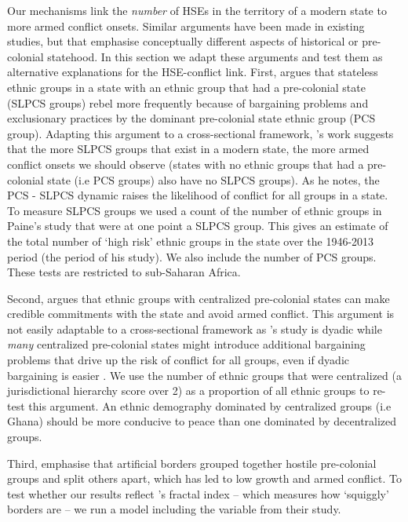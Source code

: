 Our mechanisms link the \emph{number} of HSEs in the territory of a modern state
to more armed conflict onsets. Similar arguments have been made in existing
studies, but that emphasise conceptually different aspects of historical or
pre-colonial statehood. In this section we adapt these arguments and test them
as alternative explanations for the HSE-conflict link. First, \citet{Paine2019}
argues that stateless ethnic groups in a state with an ethnic group that had a
pre-colonial state (SLPCS groups) rebel more frequently because of bargaining
problems and exclusionary practices by the dominant pre-colonial state ethnic
group (PCS group). Adapting this argument to a cross-sectional framework,
\citet{Paine2019}'s work suggests that the more SLPCS groups that exist in a
modern state, the more armed conflict onsets we should observe (states with no
ethnic groups that had a pre-colonial state (i.e PCS groups) also have no SLPCS
groups). As he notes, the PCS - SLPCS dynamic raises the likelihood of conflict
for all groups in a state. To measure SLPCS groups we used a count of the number
of ethnic groups in Paine's study that were at one point a SLPCS group. This
gives an estimate of the total number of `high risk' ethnic groups in the state
over the 1946-2013 period (the period of his study). We also include the number
of PCS groups. These tests are restricted to sub-Saharan Africa. 

Second, \citet{Wig2016} argues that ethnic groups with centralized pre-colonial
states can make credible commitments with the state and avoid armed conflict.
This argument is not easily adaptable to a cross-sectional framework as
\citet{Wig2016}'s study is dyadic while \textit{many} centralized pre-colonial
states might introduce additional bargaining problems that drive up the risk of
conflict for all groups, even if dyadic bargaining is easier
\citep{Cunningham2006, Walter2009}. We use the number of ethnic groups that
were centralized (a jurisdictional hierarchy score over 2) as a proportion of
all ethnic groups to re-test this argument. An ethnic demography dominated by
centralized groups (i.e Ghana) should be more conducive to peace than one
dominated by decentralized groups. 

Third, \citet{Alesina2011} emphasise that artificial borders grouped together
hostile pre-colonial groups and split others apart, which has led to low growth
and armed conflict. To test whether our results reflect
\citet{Alesina2011}'s fractal index -- which measures how `squiggly' borders are
-- we run a model including the variable from their study. 

